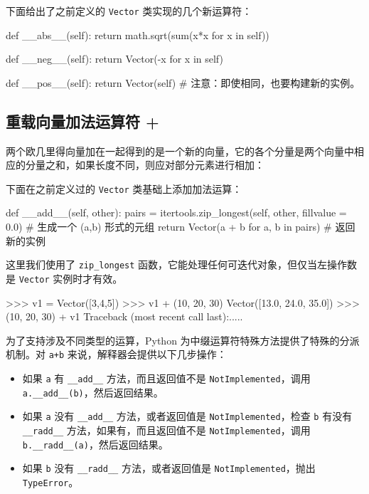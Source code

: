 下面给出了之前定义的 \texttt{Vector} 类实现的几个新运算符：

\begin{python}
def __abs__(self):
    return math.sqrt(sum(x*x for x in self))

def __neg__(self):
    return Vector(-x for x in self)

def __pos__(self):
    return Vector(self)     # 注意：即使相同，也要构建新的实例。
\end{python}

\subsection{重载向量加法运算符 +}

两个欧几里得向量加在一起得到的是一个新的向量，它的各个分量是两个向量中相应的分量之和，如果长度不同，则应对部分元素进行相加：

下面在之前定义过的 \texttt{Vector} 类基础上添加加法运算：

\begin{python}
def __add__(self, other):
    pairs = itertools.zip_longest(self, other, fillvalue = 0.0) # 生成一个 (a,b) 形式的元组
    return Vector(a + b for a, b in pairs)  # 返回新的实例
\end{python}

这里我们使用了 \texttt{zip\_longest} 函数，它能处理任何可迭代对象，但仅当左操作数是 \texttt{Vector} 实例时才有效。

\begin{python}
>>> v1 = Vector([3,4,5])
>>> v1 + (10, 20, 30)
Vector([13.0, 24.0, 35.0])
>>> (10, 20, 30) + v1
Traceback (most recent call last):.....
\end{python}

为了支持涉及不同类型的运算，Python 为中缀运算符特殊方法提供了特殊的分派机制。对 \texttt{a+b} 来说，解释器会提供以下几步操作：

\begin{itemize}
    \item 如果 \texttt{a} 有 \texttt{\_\_add\_\_} 方法，而且返回值不是 \texttt{NotImplemented}，调用 \texttt{a.\_\_add\_\_(b)}，然后返回结果。
    \item 如果 \texttt{a} 没有 \texttt{\_\_add\_\_} 方法，或者返回值是 \texttt{NotImplemented}，检查 \texttt{b} 有没有 \texttt{\_\_radd\_\_} 方法，如果有，而且返回值不是 \texttt{NotImplemented}，调用 \texttt{b.\_\_radd\_\_(a)}，然后返回结果。
    \item 如果 \texttt{b} 没有 \texttt{\_\_radd\_\_} 方法，或者返回值是 \texttt{NotImplemented}，抛出 \texttt{TypeError}。
\end{itemize}


